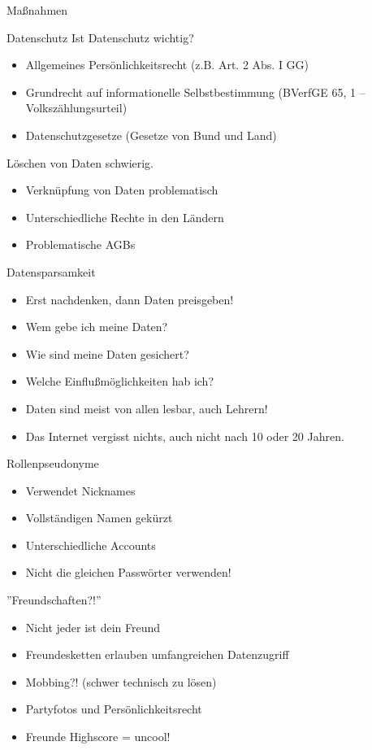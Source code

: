 \begin{frame}{Maßnahmen}
\end{frame}

\begin{frame}{Datenschutz}
	Ist Datenschutz wichtig?
	\begin{itemize}
		\item Allgemeines Pers\"onlichkeitsrecht (z.B. Art. 2 Abs. I GG)
		\item Grundrecht auf informationelle Selbstbestimmung (BVerfGE 65, 1 –Volksz\"ahlungsurteil)
		\item Datenschutzgesetze (Gesetze von Bund und Land)
	\end{itemize}
	L\"oschen von Daten schwierig.
	\begin{itemize}
		\item Verkn\"upfung von Daten problematisch
		\item Unterschiedliche Rechte in den L\"andern
		\item Problematische AGBs
	\end{itemize}
\end{frame}

\begin{frame}{Datensparsamkeit}
	\begin{itemize}
		\item Erst nachdenken, dann Daten preisgeben!
		\item Wem gebe ich meine Daten?
		\item Wie sind meine Daten gesichert?
		\item Welche Einflu\ss m\"oglichkeiten hab ich?
		\item Daten sind meist von allen lesbar, auch Lehrern!
		\item Das Internet vergisst nichts, auch nicht nach 10 oder 20 Jahren.
	\end{itemize}
\end{frame}

\begin{frame}{Rollenpseudonyme}
	\begin{itemize}
		\item Verwendet Nicknames
		\item Vollst\"andigen Namen gek\"urzt
		\item Unterschiedliche Accounts
		\item Nicht die gleichen Passw\"orter verwenden!
	\end{itemize}
\end{frame}

\begin{frame}{''Freundschaften?!''}
	\begin{itemize}
		\item Nicht jeder ist dein Freund
		\item Freundesketten erlauben umfangreichen Datenzugriff
		\item Mobbing?! (schwer technisch zu l\"osen)
		\item Partyfotos und Pers\"onlichkeitsrecht
		\item Freunde Highscore = uncool!
	\end{itemize}
\end{frame}


